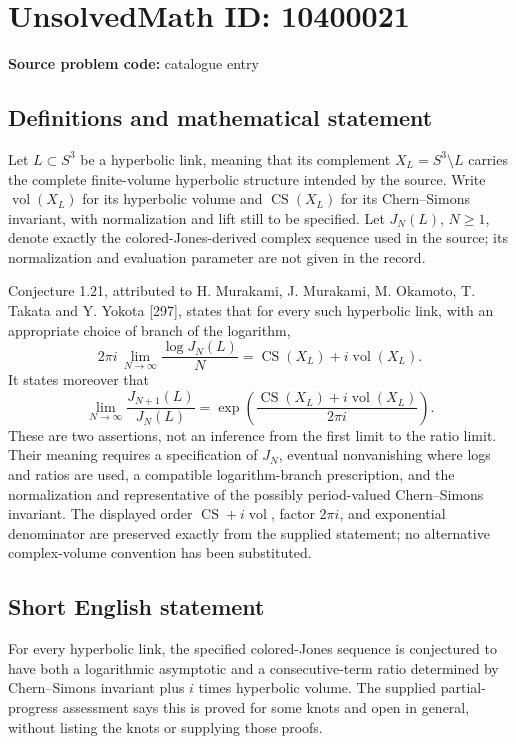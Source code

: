 \documentclass[11pt]{article}
\begin{document}
\section*{UnsolvedMath ID: 10400021}
\textbf{Source problem code:} catalogue entry
\subsection{Definitions and mathematical statement}
Let \(L\subset S^3\) be a hyperbolic link, meaning that its complement \(X_L=S^3\setminus L\) carries the complete finite-volume hyperbolic structure intended by the source. Write \(\operatorname{vol}(X_L)\) for its hyperbolic volume and \(\operatorname{CS}(X_L)\) for its Chern--Simons invariant, with normalization and lift still to be specified. Let \(J_N(L)\), \(N\ge1\), denote exactly the colored-Jones-derived complex sequence used in the source; its normalization and evaluation parameter are not given in the record.

Conjecture 1.21, attributed to H. Murakami, J. Murakami, M. Okamoto, T. Takata and Y. Yokota [297], states that for every such hyperbolic link, with an appropriate choice of branch of the logarithm,
\[
 2\pi i\,\lim_{N\to\infty}\frac{\log J_N(L)}{N}
 =\operatorname{CS}(X_L)+i\operatorname{vol}(X_L).
\]
It states moreover that
\[
 \lim_{N\to\infty}\frac{J_{N+1}(L)}{J_N(L)}
 =\exp\!\left(\frac{\operatorname{CS}(X_L)+i\operatorname{vol}(X_L)}{2\pi i}\right).
 \tag{7}
\]
These are two assertions, not an inference from the first limit to the ratio limit. Their meaning requires a specification of \(J_N\), eventual nonvanishing where logs and ratios are used, a compatible logarithm-branch prescription, and the normalization and representative of the possibly period-valued Chern--Simons invariant. The displayed order \(\operatorname{CS}+i\operatorname{vol}\), factor \(2\pi i\), and exponential denominator are preserved exactly from the supplied statement; no alternative complex-volume convention has been substituted.
\subsection{Short English statement}
For every hyperbolic link, the specified colored-Jones sequence is conjectured to have both a logarithmic asymptotic and a consecutive-term ratio determined by Chern--Simons invariant plus \(i\) times hyperbolic volume. The supplied partial-progress assessment says this is proved for some knots and open in general, without listing the knots or supplying those proofs.
\end{document}

